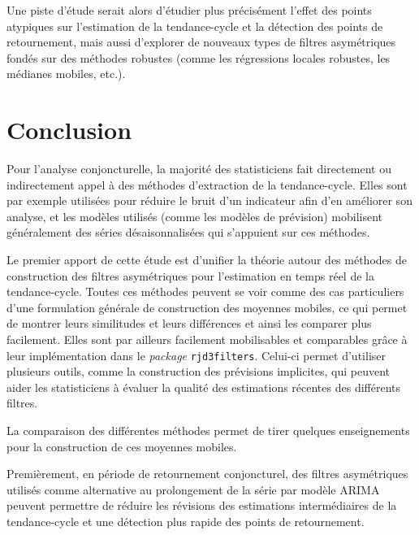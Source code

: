 \documentclass[
  12pt,
  a4paper,french]{article}
\newcommand\1{\mathds{1}}
\begin{document}
Une piste d'étude serait alors d'étudier plus précisément l'effet des points atypiques sur l'estimation de la tendance-cycle et la détection des points de retournement, mais aussi d'explorer de nouveaux types de filtres asymétriques fondés sur des méthodes robustes (comme les régressions locales robustes, les médianes mobiles, etc.).

\newpage

\hypertarget{conclusion}{%
\section*{Conclusion}\label{conclusion}}

Pour l'analyse conjoncturelle, la majorité des statisticiens fait directement ou indirectement appel à des méthodes d'extraction de la tendance-cycle.
Elles sont par exemple utilisées pour réduire le bruit d'un indicateur afin d'en améliorer son analyse, et les modèles utilisés (comme les modèles de prévision) mobilisent généralement des séries désaisonnalisées qui s'appuient sur ces méthodes.

Le premier apport de cette étude est d'unifier la théorie autour des méthodes de construction des filtres asymétriques pour l'estimation en temps réel de la tendance-cycle.
Toutes ces méthodes peuvent se voir comme des cas particuliers d'une formulation générale de construction des moyennes mobiles, ce qui permet de montrer leurs similitudes et leurs différences et ainsi les comparer plus facilement.
Elles sont par ailleurs facilement mobilisables et comparables grâce à leur implémentation dans le \emph{package}  \texttt{rjd3filters}.
Celui-ci permet d'utiliser plusieurs outils, comme la construction des prévisions implicites, qui peuvent aider les statisticiens à évaluer la qualité des estimations récentes des différents filtres.

La comparaison des différentes méthodes permet de tirer quelques enseignements pour la construction de ces moyennes mobiles.

Premièrement, en période de retournement conjoncturel, des filtres asymétriques utilisés comme alternative au prolongement de la série par modèle ARIMA peuvent permettre de réduire les révisions des estimations intermédiaires de la tendance-cycle et une détection plus rapide des points de retournement.
\end{document}
